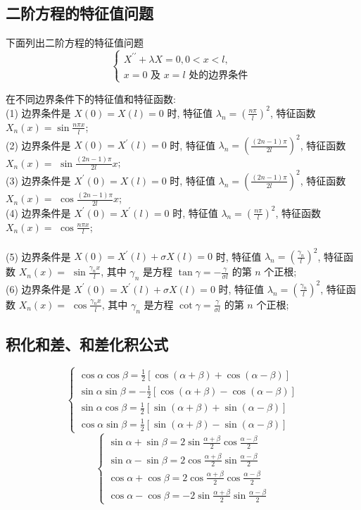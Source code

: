 \subsection{二阶方程的特征值问题}
下面列出二阶方程的特征值问题
$$
\left\{\begin{array}{l}
X^{\prime \prime}+\lambda X=0,0<x<l, \\
x=0 \text { 及 } x=l \text { 处的边界条件 }
\end{array}\right.
$$

在不同边界条件下的特征值和特征函数:\\
(1) 边界条件是 $ X(0)=X(l)=0 $ 时, 特征值 $ \lambda_{n}=\left(\frac{n \pi}{l}\right)^{2} $, 特征函数 $ X_{n}(x)=\sin \frac{n \pi x}{l} $;\\
(2) 边界条件是 $ X(0)=X^{\prime}(l)=0 $ 时, 特征值 $ \lambda_{n}=\left(\frac{(2 n-1) \pi}{2 l}\right)^{2} $, 特征函数 $ X_{n}(x)= $ $ \sin \frac{(2 n-1) \pi}{2 l} x $;\\
(3) 边界条件是 $ X^{\prime}(0)=X(l)=0 $ 时, 特征值 $ \lambda_{n}=\left(\frac{(2 n-1) \pi}{2 l}\right)^{2} $, 特征函数 $ X_{n}(x)= $ $ \cos \frac{(2 n-1) \pi}{2 l} x $;\\
(4) 边界条件是 $ X^{\prime}(0)=X^{\prime}(l)=0 $ 时, 特征值 $ \lambda_{n}=\left(\frac{n \pi}{l}\right)^{2} $, 特征函数 $ X_{n}(x)= $ $ \cos \frac{n \pi x}{l} $;\\
\\(5) 边界条件是 $ X(0)=X^{\prime}(l)+\sigma X(l)=0 $ 时, 特征值 $ \lambda_{n}=\left(\frac{\gamma_{n}}{l}\right)^{2} $, 特征函数 $ X_{n}(x)= $ $ \sin \frac{\gamma_{n} x}{l} $, 其中 $ \gamma_{n} $ 是方程 $ \tan \gamma=-\frac{\gamma}{\sigma l} $ 的第 $ n $ 个正根;
\\(6) 边界条件是 $ X^{\prime}(0)=X^{\prime}(l)+\sigma X(l)=0 $ 时, 特征值 $ \lambda_{n}=\left(\frac{\gamma_{n}}{l}\right)^{2} $, 特征函数 $ X_{n}(x)= $ $ \cos \frac{\gamma_{n} x}{l} $, 其中 $ \gamma_{n} $ 是方程 $ \cot \gamma=\frac{\gamma}{\sigma l} $ 的第 $ n $ 个正根;

\subsection{积化和差、和差化积公式}
$$
\left\{\begin{array}{l}
\cos \alpha \cos \beta=\frac{1}{2}[\cos (\alpha+\beta)+\cos (\alpha-\beta)] \\
\sin \alpha \sin \beta=-\frac{1}{2}[\cos (\alpha+\beta)-\cos (\alpha-\beta)] \\
\sin \alpha \cos \beta=\frac{1}{2}[\sin (\alpha+\beta)+\sin (\alpha-\beta)] \\
\cos \alpha \sin \beta=\frac{1}{2}[\sin (\alpha+\beta)-\sin (\alpha-\beta)]
\end{array}\right.
$$
$$
\left\{\begin{array}{l}
\sin \alpha+\sin \beta=2 \sin \frac{\alpha+\beta}{2} \cos \frac{\alpha-\beta}{2} \\
\sin \alpha-\sin \beta=2 \cos \frac{\alpha+\beta}{2} \sin \frac{\alpha-\beta}{2} \\
\cos \alpha+\cos \beta=2 \cos \frac{\alpha+\beta}{2} \cos \frac{\alpha-\beta}{2} \\
\cos \alpha-\cos \beta=-2 \sin \frac{\alpha+\beta}{2} \sin \frac{\alpha-\beta}{2}
\end{array}\right.
$$
